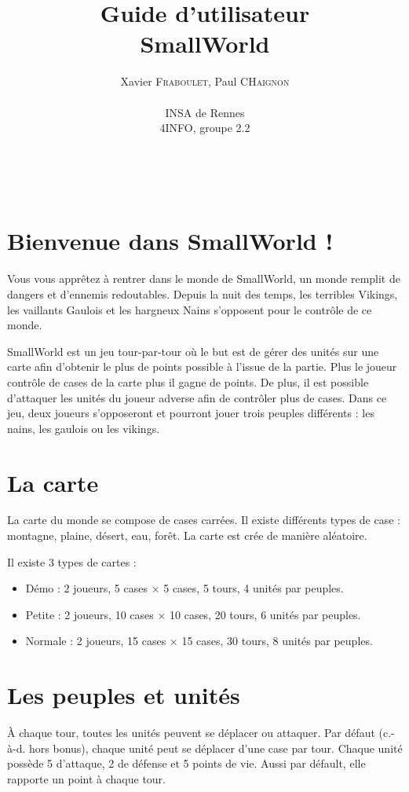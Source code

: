 \documentclass[a4paper,12pt]{article}
\author{
  Xavier \textsc{Fraboulet}, Paul \textsc{CHaignon} \\ \\
  INSA de Rennes \\
  4INFO, groupe 2.2
}
\title{Guide d'utilisateur \\ SmallWorld}
\begin{document}
\maketitle

\thispagestyle{empty}
\newpage

~~
\thispagestyle{empty}
\newpage


\tableofcontents
\newpage

\section{Bienvenue dans SmallWorld !}

Vous vous apprêtez à rentrer dans le monde de SmallWorld, un monde remplit de dangers et d'ennemis redoutables. Depuis la nuit des temps, les terribles Vikings, les vaillants Gaulois et les hargneux Nains s'opposent pour le contrôle de ce monde. 

SmallWorld est un jeu tour-par-tour où le but est de gérer des unités sur une carte afin d'obtenir le plus de points possible à l'issue de la partie. Plus le joueur contrôle de cases de la carte plus il gagne de points. De plus, il est possible d'attaquer les unités du joueur adverse afin de contrôler plus de cases. Dans ce jeu, deux joueurs s'opposeront et pourront jouer trois peuples différents : les nains, les gaulois ou les vikings.



\section{La carte}
La carte du monde se compose de cases carrées. Il existe différents types de case : montagne, plaine, désert, eau, forêt. La carte est crée de manière aléatoire.

Il existe 3 types de cartes :

\begin{itemize}
\item Démo : 2 joueurs, 5 cases × 5 cases, 5 tours, 4 unités par peuples.
\item Petite : 2 joueurs, 10 cases × 10 cases, 20 tours, 6 unités par peuples.
\item Normale : 2 joueurs, 15 cases × 15 cases, 30 tours, 8 unités par peuples.
\end{itemize}


\section{Les peuples et unités}
À chaque tour, toutes les unités peuvent se déplacer ou attaquer. Par défaut (c.-à-d. hors bonus), chaque unité peut se déplacer d’une case par tour. Chaque unité possède 5 d’attaque, 2 de défense et 5 points de vie. Aussi par défault, elle rapporte un point à chaque tour.
\end{document}
